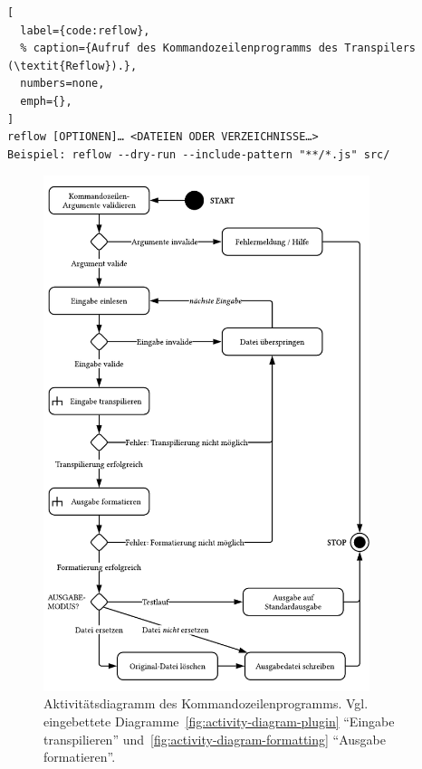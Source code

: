 \begin{lstlisting}[
  label={code:reflow},
  % caption={Aufruf des Kommandozeilenprogramms des Transpilers (\textit{Reflow}).},
  numbers=none,
  emph={},
]
reflow [OPTIONEN]… <DATEIEN ODER VERZEICHNISSE…>
Beispiel: reflow --dry-run --include-pattern "**/*.js" src/
\end{lstlisting}



\begin{figure}[tbp]
  \centering
  \includegraphics[width=0.85\textwidth]{src/4_Umsetzung/fig/activity-diagram-cli.pdf}
  \caption[Aktivitätsdiagramm des Kommandozeilenprogramms]{Aktivitätsdiagramm des Kommandozeilenprogramms. Vgl. eingebettete Diagramme~\ref{fig:activity-diagram-plugin} \enquote{Eingabe transpilieren} und~\ref{fig:activity-diagram-formatting} \enquote{Ausgabe formatieren}.}
  \label{fig:activity-diagram-cli}
\end{figure}

